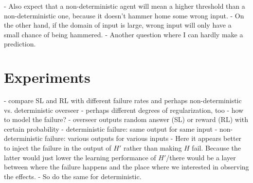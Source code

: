 - Also expect that a non-deterministic agent will mean a higher threshold than a
non-deterministic one, because it doesn't hammer home some wrong input.
- On the other hand, if the domain of input is large, wrong input will only have
a small chance of being hammered.
- Another question where I can hardly make a prediction.


\section{Experiments}

- compare SL and RL with different failure rates and perhaps
non-deterministic vs. deterministic overseer
- perhaps different degrees of regularization, too
- how to model the failure?
    - overseer outputs random answer (SL) or reward (RL) with certain
    probability
    - deterministic failure: same output for same input
    - non-deterministic failure: various outputs for various inputs
    - Here it appears better to inject the failure in the output of $H'$ rather
    than making $H$ fail. Because the latter would just lower the learning
    performance of $H'$/there would be a layer between where the failure happens
    and the place where we interested in observing the effects.
    - So do the same for deterministic.
